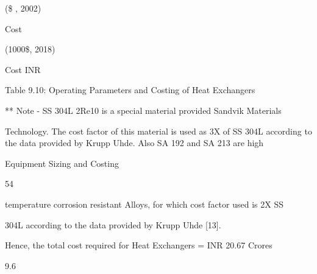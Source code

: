 \documentclass[a4paper,portrait,12pt]{article}
\begin{document}
(\$ , 2002)


\begin{flushleft}
Cost
\end{flushleft}


(1000\$, 2018)


\begin{flushleft}
Cost INR
\end{flushleft}





\begin{flushleft}
Table 9.10: Operating Parameters and Costing of Heat Exchangers
\end{flushleft}





\begin{flushleft}
** Note - SS 304L 2Re10 is a special material provided Sandvik Materials
\end{flushleft}


\begin{flushleft}
Technology. The cost factor of this material is used as 3X of SS 304L according to the data provided by Krupp Uhde. Also SA 192 and SA 213 are high
\end{flushleft}





\begin{flushleft}
\newpage
Equipment Sizing and Costing
\end{flushleft}





54





\begin{flushleft}
temperature corrosion resistant Alloys, for which cost factor used is 2X SS
\end{flushleft}


\begin{flushleft}
304L according to the data provided by Krupp Uhde [13].
\end{flushleft}


\begin{flushleft}
Hence, the total cost required for Heat Exchangers = INR 20.67 Crores
\end{flushleft}





9.6
\end{document}
